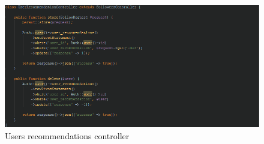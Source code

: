 \begin{figure}[H]
\centering
\includegraphics[width=1\textwidth]{Images/Implementation/UserRecommendationsController}
\caption{Users recommendations controller}
\label{fig:UserRecommendationsController}
\end{figure}